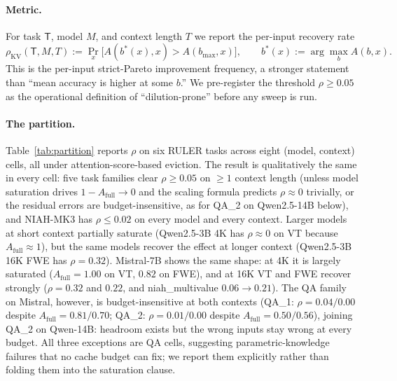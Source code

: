 \documentclass{article} %
\begin{document}
\paragraph{Metric.} For task $\mathsf{T}$, model $M$, and context length
$T$ we report the per-input recovery rate
\begin{equation}
\rho_{\mathrm{KV}}(\mathsf{T}, M, T) := \Pr_{x}\bigl[A(b^{\ast}(x), x) > A(b_{\max}, x)\bigr],
\qquad b^{\ast}(x) := \arg\max_{b} A(b, x).
\label{eq:rho}
\end{equation}
This is the per-input strict-Pareto improvement frequency, a stronger statement
than ``mean accuracy is higher at some $b$.'' We pre-register the threshold
$\rho \ge 0.05$ as the operational definition of ``dilution-prone'' before any
sweep is run.

\paragraph{The partition.} Table~\ref{tab:partition} reports $\rho$
on six RULER tasks across eight (model, context) cells, all under
attention-score-based eviction. The result is
qualitatively the same in every cell: five task families clear $\rho \ge 0.05$
on $\geq 1$ context length (unless model saturation drives $1 - A_{\mathrm{full}}
\to 0$ and the scaling formula predicts $\rho \approx 0$ trivially, or the
residual errors are budget-insensitive, as for QA\_2 on Qwen2.5-14B below),
and NIAH-MK3 has $\rho \le 0.02$ on every
model and every context. Larger models at short context partially saturate
(Qwen2.5-3B 4K has $\rho \approx 0$ on VT because $A_{\mathrm{full}} \approx 1$),
but the same models recover the effect at longer context (Qwen2.5-3B 16K FWE has
$\rho = 0.32$). Mistral-7B shows the same shape: at 4K it is largely saturated
($A_{\mathrm{full}} = 1.00$ on VT, $0.82$ on FWE), and at 16K VT and FWE
recover strongly ($\rho = 0.32$ and $0.22$, and niah\_multivalue
$0.06 \to 0.21$). The QA family on Mistral, however, is budget-insensitive
at both contexts (QA\_1: $\rho = 0.04 / 0.00$ despite
$A_{\mathrm{full}} = 0.81 / 0.70$; QA\_2: $\rho = 0.01 / 0.00$ despite
$A_{\mathrm{full}} = 0.50 / 0.56$), joining QA\_2 on Qwen-14B: headroom
exists but the wrong inputs stay wrong at every budget. All three
exceptions are QA cells, suggesting parametric-knowledge failures that no
cache budget can fix; we report them explicitly rather than folding them
into the saturation clause.
\end{document}
